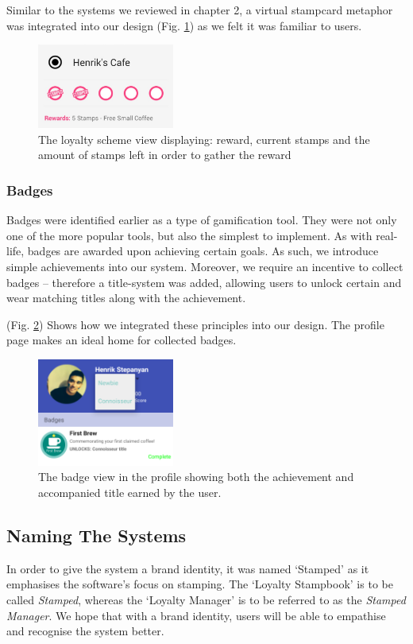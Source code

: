 Similar to the systems we reviewed in chapter 2, a virtual stampcard metaphor was integrated into our design (Fig. \ref{fig:extrinsicmotivation}) as we felt it was familiar to users.
\begin{figure}[H]
 \centering
  \includegraphics[width=0.40\textwidth]{img/stampcardprogress.jpg}
     \caption{The loyalty scheme view displaying: reward, current stamps and the amount of stamps left in order to gather the reward}
     \label{fig:extrinsicmotivation}
\end{figure}
\subsubsection{Badges}
Badges were identified earlier as a type of gamification tool. They were not only one of the more popular tools, but also the simplest to implement. As with real-life, badges are awarded upon achieving certain goals. As such, we introduce simple achievements into our system. Moreover, we require an incentive to collect badges -- therefore a title-system was added, allowing users to unlock certain and wear matching titles along with the achievement.

(Fig. \ref{fig:badge}) Shows how we integrated these principles into our design. The profile page makes an ideal home for collected badges.

\begin{figure}[H]
 \centering
  \includegraphics[width=0.40\textwidth]{img/badge.png}
     \caption{The badge view in the profile showing both the achievement and accompanied title earned by the user.}
     \label{fig:badge}
\end{figure}
\subsection{Naming The Systems}
In order to give the system a brand identity, it was named `Stamped' as it emphasises the software's focus on stamping. The `Loyalty Stampbook' is to be called \emph{Stamped}, whereas the `Loyalty Manager' is to be referred to as the \emph{Stamped Manager}. We hope that with a brand identity, users will be able to empathise and recognise the system better.

